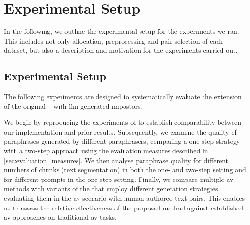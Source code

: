 \chapter{Experimental Setup}
\label{chap:experimental_setup}

In the following, we outline the experimental setup for the experiments we ran.
This includes not only allocation, preprocessing and pair selection of each dataset, but also a description and motivation for the experiments carried out.






\section{Experimental Setup}
\label{sec:experimental_setup}

The following experiments are designed to systematically evaluate the extension of the original \impAppr{}~\citep{koppel_determining_2014} with \ac{llm} generated impostors. 

We begin by reproducing the experiments of \citet{koppel_determining_2014} to establish comparability between our implementation and prior results.
Subsequently, we examine the quality of paraphrases generated by different paraphrasers, comparing a one-step strategy with a two-step approach using the evaluation measures described in \autoref{sec:evaluation_measures}.
We then analyse paraphrase quality for different numbers of chunks (text segmentation) in both the one- and two-step setting and for different prompts in the one-step setting.
Finally, we compare multiple \ac{av} methods with variants of the \impAppr{} that employ different \imp{} generation strategies, evaluating them in the \ac{av} scenario with human-authored text pairs.
This enables us to assess the relative effectiveness of the proposed method against established \ac{av} approaches on traditional \ac{av} tasks.










% 

% 

% 







